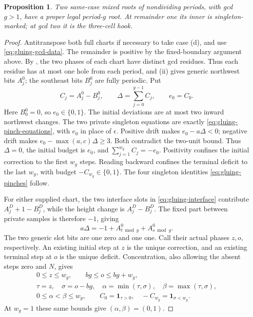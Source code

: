 \documentclass[11pt,a4paper]{amsart}
\numberwithin{equation}{section}
\theoremstyle{plain}
\newtheorem{proposition}[theorem]{Proposition}
\theoremstyle{definition}
\begin{document}
\begin{proposition}\label{prop:gluing-mixed-fold}
Two same-case mixed roots of nondividing periods, with gcd \(g>1\), have a proper legal period-\(g\) root.  At remainder one its inner is singleton-marked; at gcd two it is the three-cell hook.
\end{proposition}
\begin{proof}
Antitranspose both full charts if necessary to take case (d), and
use \eqref{eq:gluing-gcd-data}.  The remainder is positive by the
fixed-boundary argument above.  By ,
the two phases of each chart have distinct gcd residues.  Thus
each residue has at most one hole from each period, and
(ii) gives generic northwest bits
\(A^0_j\); the southeast bits \(B^0_j\) are fully periodic.  Put
\begin{equation*}
 C_j=A^0_j-B^0_j,\qquad
 \Delta=\sum_{j=0}^{g-1}C_j,\qquad e_0=C_0.
\end{equation*}
Here \(B^0_0=0\), so \(e_0\in\{0,1\}\).  The initial deviations are at most two inward northwest changes.  The two private singleton equations are exactly \eqref{eq:gluing-pinch-equations}, with \(e_0\) in place of \(\epsilon\).  Positive drift makes \(e_0-a\Delta<0\); negative drift makes \(e_0-\max(a,c)\Delta\ge3\).  Both contradict the two-unit bound.  Thus \(\Delta=0\), the initial budget is \(e_0\), and \(\sum_{j=1}^{w_g}C_j=-e_0\).  Positivity confines the initial correction to the first \(w_g\) steps.  Reading backward confines the terminal deficit to the last \(w_g\), with budget \(-C_{w_g}\in\{0,1\}\).  The four singleton identities \eqref{eq:gluing-pinches} follow.

For either supplied chart, the two interface slots in \eqref{eq:gluing-interface} contribute \(A^D_j+1-B^D_j\), while the height change is \(A^D_j-B^D_j\).  The fixed part between private samples is therefore \(-1\), giving
\begin{equation*}
 a\Delta=-1+A^0_{t\bmod g}+A^0_{s\bmod g}.
\end{equation*}
The two generic slot bits are one zero and one one.  Call their actual phases \(z,o\), respectively.  An existing initial step at \(z\) is the unique correction, and an existing terminal step at \(o\) is the unique deficit.  Concentration, also allowing the absent steps zero and \(N\), gives
\begin{equation}\label{eq:gluing-mixed-phases}
 \begin{gathered}
 0\le z\le w_g,\qquad bg\le o\le bg+w_g,\\
 \tau=z,\quad\sigma=o-bg,\quad
 \alpha=\min(\tau,\sigma),\quad\beta=\max(\tau,\sigma),\\
 0\le\alpha<\beta\le w_g,\qquad
 C_0=\mathbf1_{\tau>0},\quad -C_{w_g}=\mathbf1_{\sigma<w_g}.
 \end{gathered}
\end{equation}
At \(w_g=1\) these same bounds give \((\alpha,\beta)=(0,1)\).


\end{proof}
\end{document}
